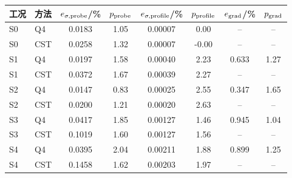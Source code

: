 \begin{tabular}{@{}llS[table-format=1.4]S[table-format=1.2]S[table-format=1.5]S[table-format=1.2]S[table-format=1.3]S[table-format=1.2]@{}}
\toprule
工况 & 方法 & {$e_{\sigma,\rm probe}$/\%} & {$p_{\rm probe}$} & {$e_{\sigma,\rm profile}$/\%} & {$p_{\rm profile}$} & {$e_{\rm grad}$/\%} & {$p_{\rm grad}$} \\
\midrule
S0 & Q4 & 0.0183 & 1.05 & 0.00007 & 0.00 &  &  \\
S0 & CST & 0.0258 & 1.32 & 0.00007 & -0.00 &  &  \\
S1 & Q4 & 0.0197 & 1.58 & 0.00040 & 2.23 & 0.633 & 1.27 \\
S1 & CST & 0.0372 & 1.67 & 0.00039 & 2.27 &  &  \\
S2 & Q4 & 0.0147 & 0.83 & 0.00025 & 2.55 & 0.347 & 1.65 \\
S2 & CST & 0.0200 & 1.21 & 0.00020 & 2.63 &  &  \\
S3 & Q4 & 0.0417 & 1.85 & 0.00127 & 1.46 & 0.945 & 1.04 \\
S3 & CST & 0.1019 & 1.60 & 0.00127 & 1.56 &  &  \\
S4 & Q4 & 0.0395 & 2.04 & 0.00211 & 1.88 & 0.899 & 1.25 \\
S4 & CST & 0.1458 & 1.62 & 0.00203 & 1.97 &  &  \\
\bottomrule
\end{tabular}
